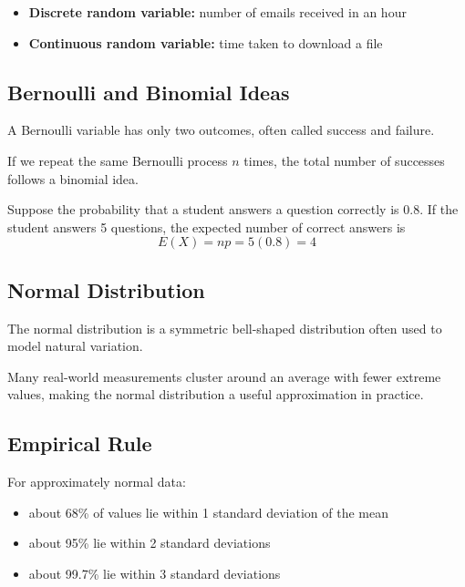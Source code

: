 \documentclass[11pt,a4paper]{article}
\begin{document}
\begin{itemize}[leftmargin=*]
  \item \textbf{Discrete random variable:} number of emails received in an hour
  \item \textbf{Continuous random variable:} time taken to download a file
\end{itemize}

\subsection{Bernoulli and Binomial Ideas}

A Bernoulli variable has only two outcomes, often called success and failure.

If we repeat the same Bernoulli process $n$ times, the total number of successes follows a binomial idea.

\begin{examplebox}
Suppose the probability that a student answers a question correctly is 0.8. If the student answers 5 questions, the expected number of correct answers is
\[
E(X) = np = 5(0.8) = 4
\]
\end{examplebox}

\subsection{Normal Distribution}

The normal distribution is a symmetric bell-shaped distribution often used to model natural variation.

\begin{conceptbox}
Many real-world measurements cluster around an average with fewer extreme values, making the normal distribution a useful approximation in practice.
\end{conceptbox}

\subsection{Empirical Rule}

For approximately normal data:

\begin{itemize}[leftmargin=*]
  \item about 68\% of values lie within 1 standard deviation of the mean
  \item about 95\% lie within 2 standard deviations
  \item about 99.7\% lie within 3 standard deviations
\end{itemize}
\end{document}
